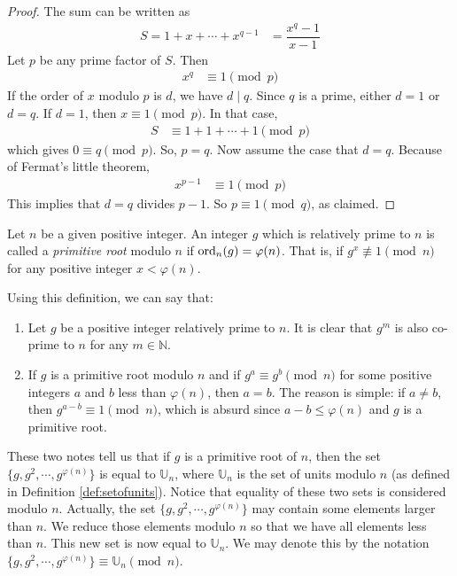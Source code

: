 \documentclass{subfile}
\begin{document}
	\begin{proof}
		The sum can be written as
			\begin{align*}
				S = 1+x+\cdots+x^{q-1} & = \dfrac{x^q-1}{x-1}
			\end{align*}
		Let $p$ be any prime factor of $S$. Then
			\begin{align*}
				x^q & \equiv1\pmod p
			\end{align*}
		If the order of $x$ modulo $p$ is $d$, we have $d\mid q$. Since $q$ is a prime, either $d=1$ or $d=q$. If $d=1$, then $x\equiv1\pmod p$. In that case,
			\begin{align*}
				S & \equiv 1+1+\cdots+1\pmod p
			\end{align*}
		which gives $0  \equiv q\pmod p$. So, $p=q$. Now assume the case that $d=q$. Because of Fermat's little theorem,
			\begin{align*}
				x^{p-1} & \equiv1\pmod p
			\end{align*}
		This implies that $d=q$ divides $p-1$. So $p\equiv1\pmod q$, as claimed.
	\end{proof}

	\begin{definition}
		Let $n$ be a given positive integer. An integer $g$ which is relatively prime to $n$  is called a \textit{primitive root} modulo $n$ if $\operatorname{ord}_n(g)=\varphi(n)$. That is, if $g^x\not\equiv1\pmod n$ for any positive integer $x<\varphi(n)$.
	\end{definition}

	\begin{note}
		Using this definition, we can say that:
			\begin{enumerate}
				\item Let $g$ be a positive integer relatively prime to $n$. It is clear that $g^m$ is also co-prime to $n$ for any $m \in \mathbb N$.
				\item If $g$ is a primitive root modulo $n$ and if $g^a \equiv g^b \pmod n$ for some positive integers $a$ and $b$ less than $\varphi(n)$, then $a=b$. The reason is simple: if $a \neq b$, then $g^{a-b} \equiv 1 \pmod n$, which is absurd since $a-b \leq \varphi(n)$ and $g$ is a primitive root.
			\end{enumerate}
	\end{note}

These two notes tell us that if $g$ is a primitive root of $n$, then the set $\{g,g^2,\cdots,g^{\varphi(n)}\}$ is equal to $\mathbb U_n$, where $\mathbb U_n$ is the set of units modulo $n$ (as defined in Definition \ref{def:setofunits}). Notice that equality of these two sets is considered modulo $n$. Actually, the set $\{g,g^2,\cdots,g^{\varphi(n)}\}$ may contain some elements larger than $n$. We reduce those elements modulo $n$ so that we have all elements less than $n$. This new set is now equal to $\mathbb U_n$. We may denote this by the notation $\{g,g^2,\cdots,g^{\varphi(n)}\} \equiv \mathbb U_n \pmod n$.
\end{document}
